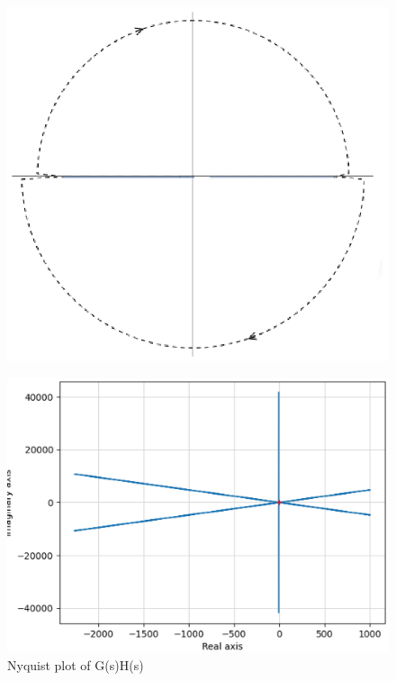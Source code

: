 \begin{enumerate}[label=\thesubsection.\arabic*.,ref=\thesubsection.\theenumi]
\begin{figure}[ht!]
    \includegraphics[width=\columnwidth]{./figs/ee18btech11025/infi.eps}
    \caption{}
    \label{fig:splane}
\end{figure}


\begin{figure}[ht!]
    \includegraphics[width=\columnwidth]{./figs/ee18btech11025/g.eps}
    \caption{Nyquist plot of G(s)H(s)}
    \label{fig:nyqplot}
\end{figure}


\end{enumerate}
